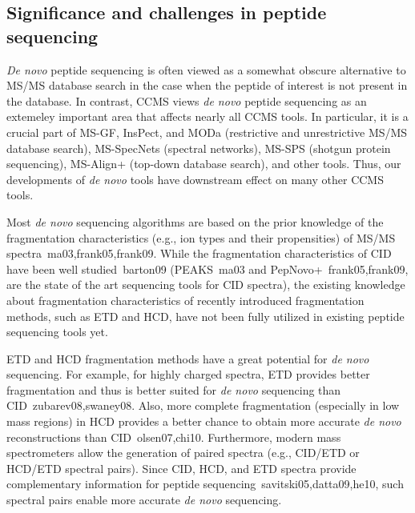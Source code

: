 \subsection{Significance and challenges in peptide sequencing} 

{\em De novo} peptide sequencing 
 is often viewed as a somewhat obscure alternative to MS/MS database search in the case when the peptide  of interest is not present in the database. In contrast, CCMS views {\em de novo} peptide sequencing as an extemeley important area that affects nearly all CCMS tools. In particular, it is a crucial part of  MS-GF, InsPect, and MODa (restrictive and unrestrictive MS/MS database search), MS-SpecNets (spectral networks), MS-SPS (shotgun protein sequencing), MS-Align+ (top-down database search), and other tools. 
Thus, our developments of {\em de novo} tools have downstream effect on many other CCMS tools.  

Most {\em de novo} sequencing algorithms are based on the prior knowledge of the fragmentation characteristics (e.g., ion types and their propensities) of MS/MS spectra~\cite{unv}{ma03,frank05,frank09}. 
While the fragmentation characteristics of CID have been well studied~\cite{unv}{barton09} (PEAKS~\cite{unv}{ma03} and PepNovo+~\cite{unv}{frank05,frank09},  are the state of the art sequencing tools for CID spectra), the existing knowledge about fragmentation characteristics  of recently introduced fragmentation methods, such as ETD and HCD, have not been fully utilized in existing peptide sequencing tools yet.  


 ETD and HCD fragmentation methods  have a great potential for {\em de novo} sequencing. 
For example, for highly charged  spectra, ETD provides better fragmentation and thus is better suited for {\em de novo} sequencing than CID~\cite{unv}{zubarev08,swaney08}. Also, more complete fragmentation (especially in low mass regions) in HCD provides a better chance to obtain more accurate {\em de novo} reconstructions than CID~\cite{unv}{olsen07,chi10}. Furthermore, modern mass spectrometers allow the generation of  paired spectra (e.g., CID/ETD or HCD/ETD spectral pairs). Since CID, HCD, and  ETD spectra provide complementary information for peptide sequencing~\cite{unv}{savitski05,datta09,he10}, such spectral pairs enable more accurate {\em de novo} sequencing.  


